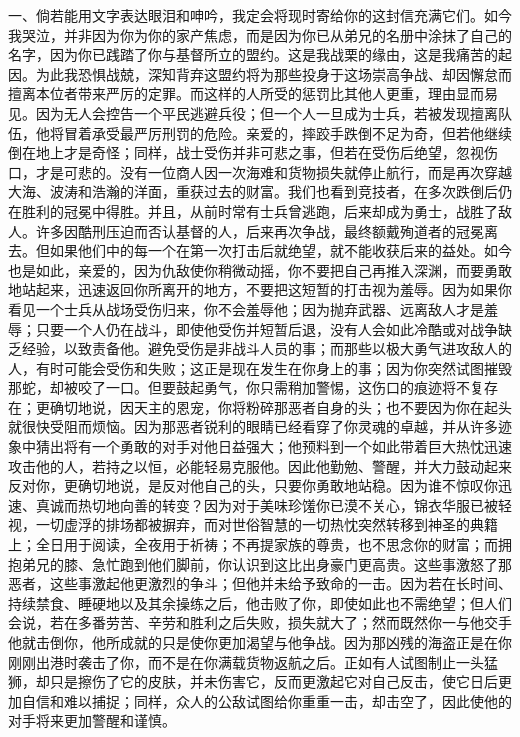 一、倘若能用文字表达眼泪和呻吟，我定会将现时寄给你的这封信充满它们。如今我哭泣，并非因为你为你的家产焦虑，而是因为你已从弟兄的名册中涂抹了自己的名字，因为你已践踏了你与基督所立的盟约。这是我战栗的缘由，这是我痛苦的起因。为此我恐惧战兢，深知背弃这盟约将为那些投身于这场崇高争战、却因懈怠而擅离本位者带来严厉的定罪。而这样的人所受的惩罚比其他人更重，理由显而易见。因为无人会控告一个平民逃避兵役；但一个人一旦成为士兵，若被发现擅离队伍，他将冒着承受最严厉刑罚的危险。亲爱的，摔跤手跌倒不足为奇，但若他继续倒在地上才是奇怪；同样，战士受伤并非可悲之事，但若在受伤后绝望，忽视伤口，才是可悲的。没有一位商人因一次海难和货物损失就停止航行，而是再次穿越大海、波涛和浩瀚的洋面，重获过去的财富。我们也看到竞技者，在多次跌倒后仍在胜利的冠冕中得胜。并且，从前时常有士兵曾逃跑，后来却成为勇士，战胜了敌人。许多因酷刑压迫而否认基督的人，后来再次争战，最终额戴殉道者的冠冕离去。但如果他们中的每一个在第一次打击后就绝望，就不能收获后来的益处。如今也是如此，亲爱的，因为仇敌使你稍微动摇，你不要把自己再推入深渊，而要勇敢地站起来，迅速返回你所离开的地方，不要把这短暂的打击视为羞辱。因为如果你看见一个士兵从战场受伤归来，你不会羞辱他；因为抛弃武器、远离敌人才是羞辱；只要一个人仍在战斗，即使他受伤并短暂后退，没有人会如此冷酷或对战争缺乏经验，以致责备他。避免受伤是非战斗人员的事；而那些以极大勇气进攻敌人的人，有时可能会受伤和失败；这正是现在发生在你身上的事；因为你突然试图摧毁那蛇，却被咬了一口。但要鼓起勇气，你只需稍加警惕，这伤口的痕迹将不复存在；更确切地说，因天主的恩宠，你将粉碎那恶者自身的头；也不要因为你在起头就很快受阻而烦恼。因为那恶者锐利的眼睛已经看穿了你灵魂的卓越，并从许多迹象中猜出将有一个勇敢的对手对他日益强大；他预料到一个如此带着巨大热忱迅速攻击他的人，若持之以恒，必能轻易克服他。因此他勤勉、警醒，并大力鼓动起来反对你，更确切地说，是反对他自己的头，只要你勇敢地站稳。因为谁不惊叹你迅速、真诚而热切地向善的转变？因为对于美味珍馐你已漠不关心，锦衣华服已被轻视，一切虚浮的排场都被摒弃，而对世俗智慧的一切热忱突然转移到神圣的典籍上；全日用于阅读，全夜用于祈祷；不再提家族的尊贵，也不思念你的财富；而拥抱弟兄的膝、急忙跑到他们脚前，你认识到这比出身豪门更高贵。这些事激怒了那恶者，这些事激起他更激烈的争斗；但他并未给予致命的一击。因为若在长时间、持续禁食、睡硬地以及其余操练之后，他击败了你，即使如此也不需绝望；但人们会说，若在多番劳苦、辛劳和胜利之后失败，损失就大了；然而既然你一与他交手他就击倒你，他所成就的只是使你更加渴望与他争战。因为那凶残的海盗正是在你刚刚出港时袭击了你，而不是在你满载货物返航之后。正如有人试图制止一头猛狮，却只是擦伤了它的皮肤，并未伤害它，反而更激起它对自己反击，使它日后更加自信和难以捕捉；同样，众人的公敌试图给你重重一击，却击空了，因此使他的对手将来更加警醒和谨慎。\par

